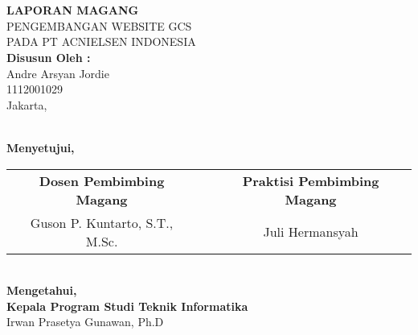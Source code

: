 
\section*{}
{\centering %
\textbf{LAPORAN MAGANG}\\[2ex]
PENGEMBANGAN WEBSITE GCS\\
PADA PT ACNIELSEN INDONESIA\\[3ex]
\textbf{Disusun Oleh :}\\[2ex]
Andre Arsyan Jordie\\
1112001029\\[2ex]
Jakarta, \date{\mydateformat\today}\\[5ex] %
\textbf{Menyetujui,}\\[1ex]
\begin{tabular}{ccc} %
\textbf{Dosen Pembimbing Magang} & \hspace{1cm} & \textbf{Praktisi Pembimbing Magang} \\ [10ex] %
 Guson P. Kuntarto, S.T., M.Sc. & \hspace{1cm} & Juli Hermansyah
\end{tabular}
\\[5ex]
\textbf{Mengetahui,\\[1ex]
Kepala Program Studi Teknik Informatika}\\[10ex]
Irwan Prasetya Gunawan, Ph.D\\
} %



